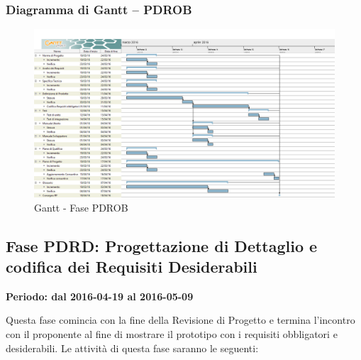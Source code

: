 \documentclass[../PianoProgetto.tex]{subfiles}
\begin{document}
		\subsubsection{Diagramma di Gantt – PDROB}
			\begin{figure}[!h]
				\centering
				\includegraphics[width=\textwidth]{gantt_png/4-requisiti_obbligatori}
				\caption{Gantt - Fase PDROB}
				\label{fig:Gantt - Fase PDROB}
			\end{figure}

	\subsection{Fase PDRD: Progettazione di Dettaglio e codifica dei Requisiti Desiderabili}
		\textbf{Periodo: dal 2016-04-19 al 2016-05-09}
		
		Questa fase comincia con la fine della Revisione di Progetto e termina l’incontro con il proponente al fine di mostrare il prototipo con i requisiti obbligatori e desiderabili. Le attività di questa fase saranno le seguenti:
\end{document}
